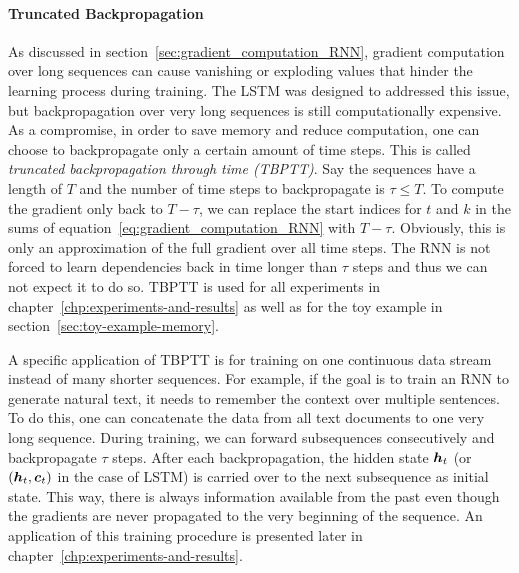		\paragraph{Truncated Backpropagation}
		As discussed in section~\ref{sec:gradient_computation_RNN}, gradient computation over long sequences can cause vanishing or exploding values that hinder the learning process during training.
		The LSTM was designed to addressed this issue, but backpropagation over very long sequences is still computationally expensive.
		As a compromise, in order to save memory and reduce computation, one can choose to backpropagate only a certain amount of time steps.
		This is called \emph{truncated backpropagation through time (TBPTT)}. 
		Say the sequences have a length of $T$ and the number of time steps to backpropagate is $\tau \leq T$.
		To compute the gradient only back to $T - \tau$, we can replace the start indices for $t$ and $k$ in the sums of equation~\ref{eq:gradient_computation_RNN} with $T - \tau$.
		Obviously, this is only an approximation of the full gradient over all time steps.
		The RNN is not forced to learn dependencies back in time longer than $\tau$ steps and thus we can not expect it to do so. 
		TBPTT is used for all experiments in chapter~\ref{chp:experiments-and-results} as well as for the toy example in section~\ref{sec:toy-example-memory}.
		
		A specific application of TBPTT is for training on one continuous data stream instead of many shorter sequences.
		For example, if the goal is to train an RNN to generate natural text, it needs to remember the context over multiple sentences.
		To do this, one can concatenate the data from all text documents to one very long sequence.
		During training, we can forward subsequences consecutively and backpropagate $\tau$ steps.
		After each backpropagation, the hidden state $\bm{h}_t$ (or $(\bm{h}_t, \bm{c}_t)$ in the case of LSTM) is carried over to the next subsequence as initial state.
		This way, there is always information available from the past even though the gradients are never propagated to the very beginning of the sequence.
		An application of this training procedure is presented later in chapter~\ref{chp:experiments-and-results}.
		
